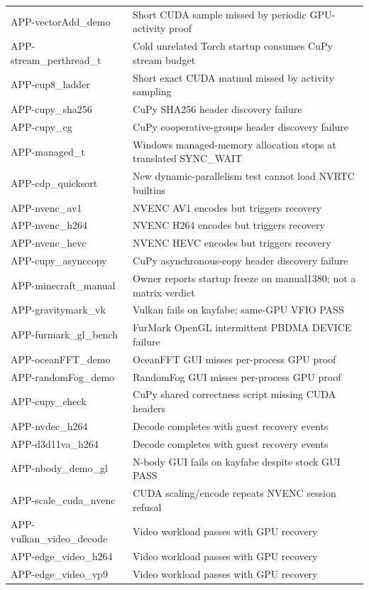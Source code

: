{\begin{longtable}{@{}p{38mm}p{117mm}@{}}
APP-vectorAdd\_demo & Short CUDA sample missed by periodic GPU-activity proof \\
APP-stream\_perthread\_t & Cold unrelated Torch startup consumes CuPy stream budget \\
APP-cup8\_ladder & Short exact CUDA matmul missed by activity sampling \\
APP-cupy\_sha256 & CuPy SHA256 header discovery failure \\
APP-cupy\_cg & CuPy cooperative-groups header discovery failure \\
APP-managed\_t & Windows managed-memory allocation stops at translated SYNC\_WAIT \\
APP-cdp\_quicksort & New dynamic-parallelism test cannot load NVRTC builtins \\
APP-nvenc\_av1 & NVENC AV1 encodes but triggers recovery \\
APP-nvenc\_h264 & NVENC H264 encodes but triggers recovery \\
APP-nvenc\_hevc & NVENC HEVC encodes but triggers recovery \\
APP-cupy\_asynccopy & CuPy asynchronous-copy header discovery failure \\
APP-minecraft\_manual & Owner reports startup freeze on manual1380; not a matrix verdict \\
APP-gravitymark\_vk & Vulkan fails on kayfabe; same-GPU VFIO PASS \\
APP-furmark\_gl\_bench & FurMark OpenGL intermittent PBDMA DEVICE failure \\
APP-oceanFFT\_demo & OceanFFT GUI misses per-process GPU proof \\
APP-randomFog\_demo & RandomFog GUI misses per-process GPU proof \\
APP-cupy\_check & CuPy shared correctness script missing CUDA headers \\
APP-nvdec\_h264 & Decode completes with guest recovery events \\
APP-d3d11va\_h264 & Decode completes with guest recovery events \\
APP-nbody\_demo\_gl & N-body GUI fails on kayfabe despite stock GUI PASS \\
APP-scale\_cuda\_nvenc & CUDA scaling/encode repeats NVENC session refusal \\
APP-vulkan\_video\_decode & Video workload passes with GPU recovery \\
APP-edge\_video\_h264 & Video workload passes with GPU recovery \\
APP-edge\_video\_vp9 & Video workload passes with GPU recovery \\

\end{longtable}}
